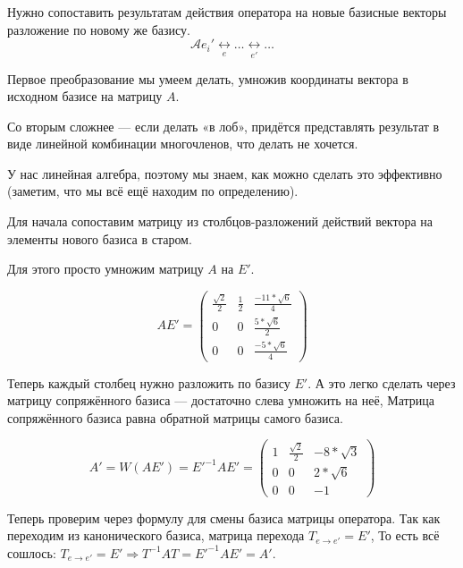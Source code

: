 \documentclass[12pt, a4paper]{article}
\begin{document}
    Нужно сопоставить результатам действия оператора 
    на новые базисные векторы разложение по новому же базису.
    \begin{equation}
        \mathcal{A} e_i' \underset{e}{\longleftrightarrow} \ldots 
        \underset{e'}{\longleftrightarrow} \ldots
    \end{equation}

    Первое преобразование мы умеем делать, умножив координаты вектора
    в исходном базисе на матрицу $A$. 
    
    Со вторым сложнее — если делать «в лоб», 
    придётся представлять результат в виде линейной комбинации 
    многочленов, что делать не хочется.

    У нас линейная алгебра, поэтому мы знаем, как можно сделать это эффективно 
    (заметим, что мы всё ещё находим по определению).

    Для начала сопоставим матрицу из столбцов-разложений 
    действий вектора на элементы нового базиса в старом. 

    Для этого просто умножим матрицу $A$ на $E'$.

    \begin{equation}
        A E' = \left(\begin{matrix}
            \frac{\sqrt{2}}{2} & \frac{1}{2} & \frac{-11*\sqrt{6}}{4} \\
            0 & 0 & \frac{5*\sqrt{6}}{2} \\
            0 & 0 & \frac{-5*\sqrt{6}}{4}
        \end{matrix}\right)
    \end{equation}

    Теперь каждый столбец нужно разложить по базису $E'$. 
    А это легко сделать через матрицу сопряжённого базиса — достаточно слева умножить на неё,
    Матрица сопряжённого базиса равна обратной матрицы самого базиса.


    \begin{equation}
        A' = W (A E') = E'^{-1} A E' = \left(\begin{matrix}
            1 & \frac{\sqrt{2}}{2} & -8*\sqrt{3} \\
            0 & 0 & 2*\sqrt{6} \\
            0 & 0 & -1
        \end{matrix}\right)
    \end{equation}

    Теперь проверим через формулу для смены базиса матрицы оператора.
    Так как переходим из канонического базиса, матрица перехода $T_{e → e'} = E'$,
    То есть всё сошлось: $T_{e → e'} = E' \Rightarrow T^{-1} A T = E'^{-1} A E' = A'$.
\end{document}

